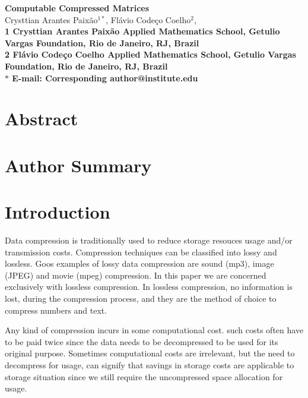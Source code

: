 \documentclass[10pt]{article}
\date{}
\begin{document}
\begin{flushleft}
{\Large
\textbf{Computable Compressed Matrices}
}
\\
Crysttian Arantes Paix\~{a}o$^{1\ast}$, 
Fl\'{a}vio Code\c{c}o Coelho$^{2}$, 
\\
\bf{1} Crysttian Arantes Paix\~{a}o Applied Mathematics School, Getulio Vargas Foundation, Rio de Janeiro, RJ, Brazil
\\
\bf{2} Fl\'{a}vio Code\c{c}o Coelho Applied Mathematics School, Getulio Vargas Foundation, Rio de Janeiro, RJ, Brazil
\\
$\ast$ E-mail: Corresponding author@institute.edu
\end{flushleft}

\section*{Abstract}

\section*{Author Summary}

\section*{Introduction}

Data compression is traditionally used to reduce storage resouces usage and/or transmission costs\cite{salomon}. Compression techniques can be classified into lossy and lossless. Goos examples of lossy data compression are sound (mp3), image (JPEG) and movie (mpeg) compression. In this paper we are concerned exclusively with lossless compression. In lossless compression, no information is lost, during the compression process, and they are the method of choice to compress numbers and text.  

Any kind of compression incurs in some computational cost. such costs often have to be paid twice since the data needs to be decompressed to be used for its original purpose. Sometimes computational costs are irrelevant, but the need to decompress for usage, can signify that savings in storage costs are applicable to storage situation since we still require the uncompressed space allocation for usage.
\end{document}
